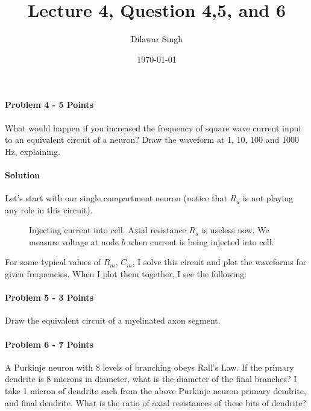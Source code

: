 \documentclass[a4paper,10pt]{article}
\title{Lecture 4, Question 4,5, and 6}
\author{Dilawar Singh}
\date{\today}
\begin{document}
\maketitle

\paragraph{Problem 4 - 5 Points}
\label{par:Problem 4}
What would happen if you increased the frequency of square wave current input to 
an equivalent circuit of a neuron? Draw the waveform at 1, 10, 100 and 1000 Hz, 
explaining.

\paragraph{Solution} Let's start with our single compartment neuron (notice that
$R_a$ is not playing any role in this circuit).

\begin{figure}[h]
    \usetikzlibrary{shapes,shadows,circuits.ee.IEC}
    \centering
    \caption{Injecting current into cell. Axial resistance $R_a$ is useless now.
    We measure voltage at node $b$ when current is being injected into cell.}
    \label{fig:sphere}
\end{figure}

For some typical values of $R_m$, $C_m$, I solve this circuit and plot the
waveforms for given frequencies. When I plot them together, I see the following:

\paragraph{Problem 5 - 3 Points}
Draw the equivalent circuit of a myelinated axon segment.

\paragraph{Problem 6 - 7 Points}
A Purkinje neuron with 8 levels of branching obeys Rall’s Law. If the primary
dendrite is 8 microns in diameter, what is the diameter of the final branches?
I take 1 micron of dendrite each from the above Purkinje neuron primary
dendrite, and final dendrite. What is the ratio of axial resistances of these
bits of dendrite?
\end{document}
